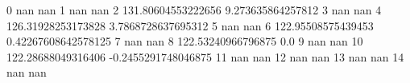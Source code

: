 0 nan nan
1 nan nan
2 131.80604553222656 9.273635864257812
3 nan nan
4 126.31928253173828 3.7868728637695312
5 nan nan
6 122.95508575439453 0.42267608642578125
7 nan nan
8 122.53240966796875 0.0
9 nan nan
10 122.28688049316406 -0.2455291748046875
11 nan nan
12 nan nan
13 nan nan
14 nan nan
